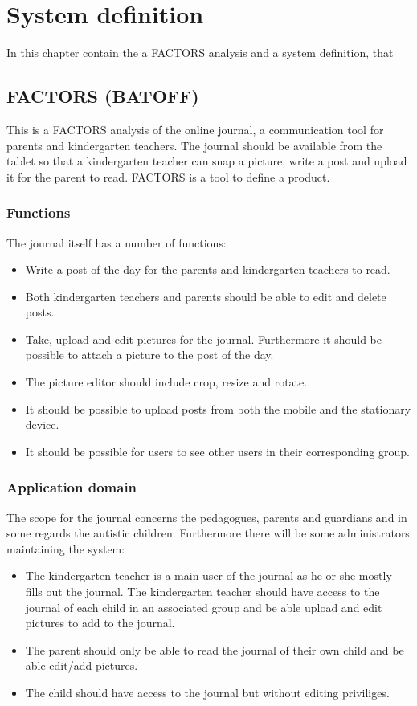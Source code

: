 \chapter{System definition}
In this chapter contain the a FACTORS analysis and a system definition, that  

\section{FACTORS (BATOFF)}
This is a FACTORS analysis of the online journal, a communication tool for parents and kindergarten teachers. The journal should be available from the tablet so that a kindergarten teacher can snap a picture, write a post and upload it for the parent to read. FACTORS is a tool to define a product.

\subsection{Functions}
The journal itself has a number of functions:
\begin{itemize}
	\item{Write a post of the day for the parents and kindergarten teachers to read.}
	\item{Both kindergarten teachers and parents should be able to edit and delete posts.}
	\item{Take, upload and edit pictures for the journal. Furthermore it should be possible to attach a picture to the post of the day.}
	\item{The picture editor should include crop, resize and rotate.}
	\item{It should be possible to upload posts from both the mobile and the stationary device.}
	\item{It should be possible for users to see other users in their corresponding group.}
\end{itemize}

\subsection{Application domain}
The scope for the journal concerns the pedagogues, parents and guardians and in some regards the autistic children. Furthermore there will be some administrators maintaining the system:
\begin{itemize}
	\item{The kindergarten teacher is a main user of the journal as he or she mostly fills out the journal. The kindergarten teacher should have access to the journal of each child in an associated group and be able upload and edit pictures to add to the journal.}
	\item{The parent should only be able to read the journal of their own child and be able edit/add pictures.}
	\item{The child should have access to the journal but without editing priviliges.}
\end{itemize}


